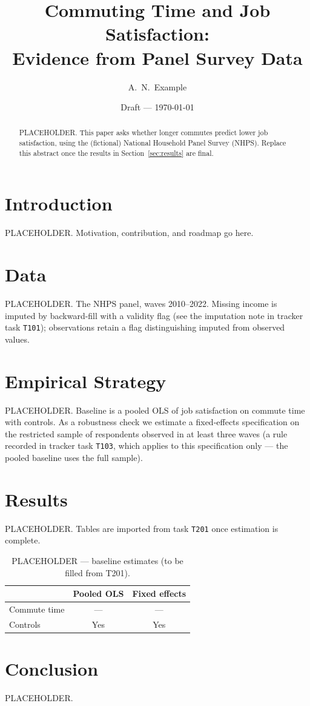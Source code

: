 \documentclass[12pt]{article}
\title{Commuting Time and Job Satisfaction:\\
       Evidence from Panel Survey Data}
\author{A.~N.~Example}
\date{Draft --- \today}
\begin{document}
\maketitle

\begin{abstract}
PLACEHOLDER. This paper asks whether longer commutes predict lower job
satisfaction, using the (fictional) National Household Panel Survey (NHPS). Replace
this abstract once the results in Section~\ref{sec:results} are final.
\end{abstract}

\section{Introduction}
PLACEHOLDER. Motivation, contribution, and roadmap go here.

\section{Data}\label{sec:data}
PLACEHOLDER. The NHPS panel, waves 2010--2022. Missing income is imputed
by backward-fill with a validity flag (see the imputation note in tracker
task \texttt{T101}); observations retain a flag distinguishing imputed from
observed values.

\section{Empirical Strategy}
PLACEHOLDER. Baseline is a pooled OLS of job satisfaction on commute time
with controls. As a robustness check we estimate a fixed-effects
specification on the restricted sample of respondents observed in at least
three waves (a rule recorded in tracker task \texttt{T103}, which applies to
this specification only --- the pooled baseline uses the full sample).

\section{Results}\label{sec:results}
PLACEHOLDER. Tables are imported from task \texttt{T201} once estimation
is complete.

\begin{table}[t]
  \centering
  \caption{PLACEHOLDER --- baseline estimates (to be filled from T201).}
  \begin{tabular}{lcc}
    \toprule
                     & Pooled OLS & Fixed effects \\
    \midrule
    Commute time     & ---        & ---           \\
    Controls         & Yes        & Yes           \\
    \bottomrule
  \end{tabular}
\end{table}

\section{Conclusion}
PLACEHOLDER.


\end{document}
